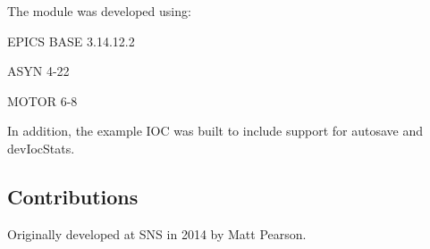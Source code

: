 The module was developed using: 
\begin{DoxyItemize}
\item EPICS BASE 3.14.12.2 
\item ASYN 4-\/22 
\item MOTOR 6-\/8 
\end{DoxyItemize}

In addition, the example IOC was built to include support for autosave and devIocStats.\hypertarget{index_Contributions}{}\subsection{Contributions}\label{index_Contributions}
Originally developed at SNS in 2014 by Matt Pearson. 